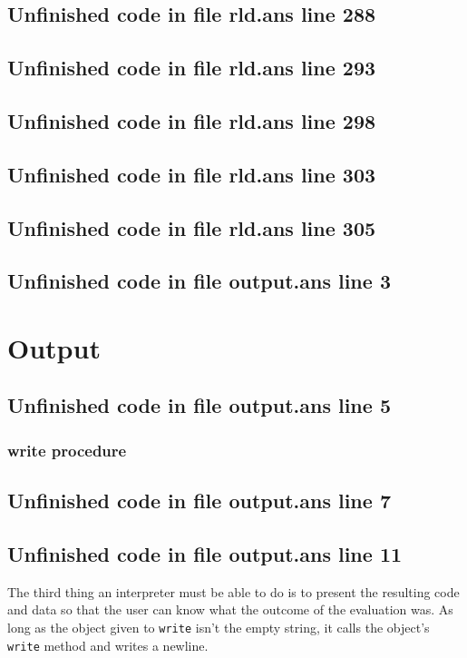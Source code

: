 \documentclass[twoside,9pt]{report}
\begin{document}
\section{Unfinished code in file rld.ans line 288}
\section{Unfinished code in file rld.ans line 293}
\section{Unfinished code in file rld.ans line 298}
\section{Unfinished code in file rld.ans line 303}
\section{Unfinished code in file rld.ans line 305}
\section{Unfinished code in file output.ans line 3}
\chapter{Output}
\label{output}
\section{Unfinished code in file output.ans line 5}
\subsection{write procedure}
\label{write-procedure}
\section{Unfinished code in file output.ans line 7}

\section{Unfinished code in file output.ans line 11}

The third thing an interpreter must be able to do is to present the resulting code and data so that the user can know what the outcome of the evaluation was. As long as the object given to \texttt{write} isn't the empty string, it calls the object's \texttt{write} method and writes a newline.
\end{document}
